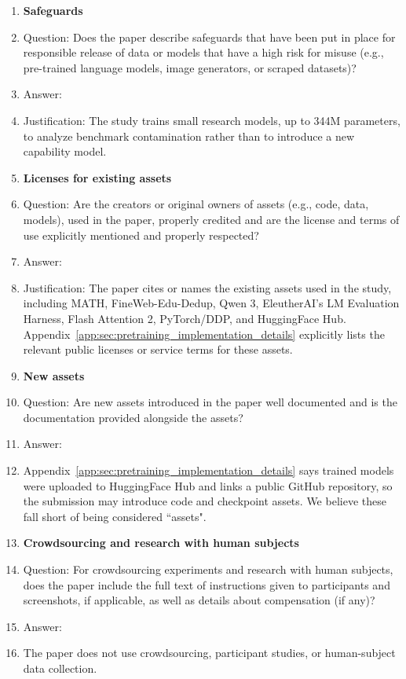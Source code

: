 \begin{enumerate}
\item {\bf Safeguards}
    \item[] Question: Does the paper describe safeguards that have been put in place for responsible release of data or models that have a high risk for misuse (e.g., pre-trained language models, image generators, or scraped datasets)?
    \item[] Answer: \answerNA{}
    \item[] Justification: The study trains small research models, up to 344M parameters, to analyze benchmark contamination rather than to introduce a new capability model. 

\item {\bf Licenses for existing assets}
    \item[] Question: Are the creators or original owners of assets (e.g., code, data, models), used in the paper, properly credited and are the license and terms of use explicitly mentioned and properly respected?
    \item[] Answer: \answerYes{}
    \item[] Justification: The paper cites or names the existing assets used in the study, including MATH, FineWeb-Edu-Dedup, Qwen 3, EleutherAI's LM Evaluation Harness, Flash Attention 2, PyTorch/DDP, and HuggingFace Hub. Appendix~\ref{app:sec:pretraining_implementation_details} explicitly lists the relevant public licenses or service terms for these assets.

\item {\bf New assets}
    \item[] Question: Are new assets introduced in the paper well documented and is the documentation provided alongside the assets?
    \item[] Answer: \answerNA{}
    \item[] Appendix~\ref{app:sec:pretraining_implementation_details} says trained models were uploaded to HuggingFace Hub and links a public GitHub repository, so the submission may introduce code and checkpoint assets. We believe these fall short of being considered ``assets".

\item {\bf Crowdsourcing and research with human subjects}
    \item[] Question: For crowdsourcing experiments and research with human subjects, does the paper include the full text of instructions given to participants and screenshots, if applicable, as well as details about compensation (if any)? 
    \item[] Answer: \answerNA{}
    \item[] The paper does not use crowdsourcing, participant studies, or human-subject data collection.


\end{enumerate}
